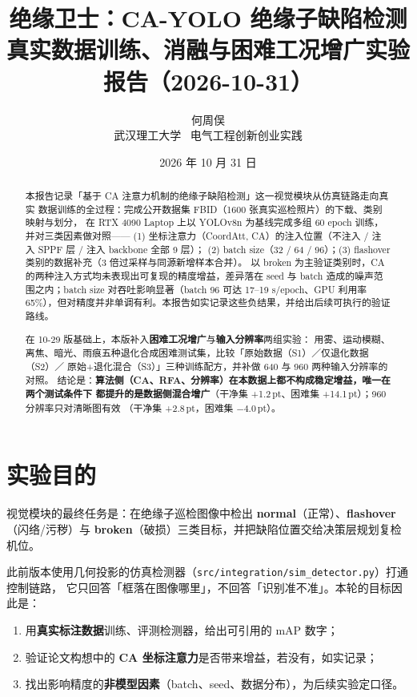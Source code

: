 \documentclass[UTF8,a4paper,11pt]{ctexart}
\title{\textbf{绝缘卫士：CA-YOLO 绝缘子缺陷检测}\\[0.4em]
\large 真实数据训练、消融与困难工况增广实验报告（2026-10-31）}
\author{何周俣\\武汉理工大学 \, 电气工程创新创业实践}
\date{2026 年 10 月 31 日}
\begin{document}
\maketitle

\begin{abstract}
\noindent 本报告记录「基于 CA 注意力机制的绝缘子缺陷检测」这一视觉模块从仿真链路走向真实
数据训练的全过程：完成公开数据集 FBID（1600 张真实巡检照片）的下载、类别映射与划分，
在 RTX 4090 Laptop 上以 YOLOv8n 为基线完成多组 60 epoch 训练，并对三类因素做对照——
(1) 坐标注意力（CoordAtt, CA）的注入位置（不注入 / 注入 SPPF 层 / 注入 backbone 全部 9 层）；
(2) batch size（32 / 64 / 96）；(3) flashover 类别的数据补充（3 倍过采样与同源新增样本合并）。
以 broken 为主验证类别时，CA 的两种注入方式均未表现出可复现的精度增益，差异落在 seed 与
batch 造成的噪声范围之内；batch size 对吞吐影响显著（batch 96 可达 17--19 s/epoch、GPU
利用率 65\%），但对精度并非单调有利。本报告如实记录这些负结果，并给出后续可执行的验证路线。

\vspace{0.6em}
\noindent 在 10-29 版基础上，本版补入\textbf{困难工况增广}与\textbf{输入分辨率}两组实验：
用雾、运动模糊、离焦、暗光、雨痕五种退化合成困难测试集，比较「原始数据（S1）／仅退化数据（S2）／
原始+退化混合（S3）」三种训练配方，并补做 640 与 960 两种输入分辨率的对照。
结论是：\textbf{算法侧（CA、RFA、分辨率）在本数据上都不构成稳定增益，唯一在两个测试条件下
都提升的是数据侧混合增广}（干净集 +1.2\,pt、困难集 +14.1\,pt）；960 分辨率只对清晰图有效
（干净集 +2.8\,pt，困难集 $-4.0$\,pt）。
\end{abstract}

\section{实验目的}

视觉模块的最终任务是：在绝缘子巡检图像中检出 \textbf{normal}（正常）、\textbf{flashover}
（闪络/污秽）与 \textbf{broken}（破损）三类目标，并把缺陷位置交给决策层规划复检机位。

此前版本使用几何投影的仿真检测器（\texttt{src/integration/sim\_detector.py}）打通控制链路，
它只回答「框落在图像哪里」，不回答「识别准不准」。本轮的目标因此是：

\begin{enumerate}[label=(\arabic*)]
  \item 用\textbf{真实标注数据}训练、评测检测器，给出可引用的 mAP 数字；
  \item 验证论文构想中的 \textbf{CA 坐标注意力}是否带来增益，若没有，如实记录；
  \item 找出影响精度的\textbf{非模型因素}（batch、seed、数据分布），为后续实验定口径。
\end{enumerate}
\end{document}
